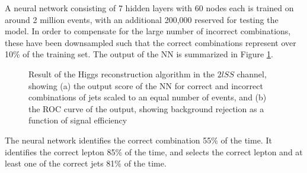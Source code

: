 
A neural network consisting of 7 hidden layers with 60 nodes each is trained on around 2 million events, with an additional 200,000 reserved for testing the model. In order to compensate for the large number of incorrect combinations, these have been downsampled such that the correct combinations represent over 10\% of the training set. The output of the NN is summarized in Figure \ref{fig:higgs2lSSresults}.

\begin{figure}[H]
    \centering
  \label{fig:higgs2lSSresults}
  \caption{Result of the Higgs reconstruction algorithm in the $2lSS$ channel, showing (a) the output score of the NN for correct and incorrect combinations of jets scaled to an equal number of events, and (b) the ROC curve of the output, showing background rejection as a function of signal efficiency}
\end{figure} 

The neural network identifies the correct combination 55\% of the time. It identifies the correct lepton 85\% of the time, and selects the correct lepton and at least one of the correct jets 81\% of the time.

